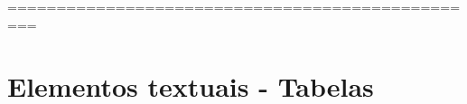 \documentclass[	DIV=calc,%
							paper=a4,%
							fontsize=12pt,%
							onecolumn]{scrartcl}	 					%
\begin{document}
=================================================
\section{Elementos textuais - Tabelas}

\end{document}
